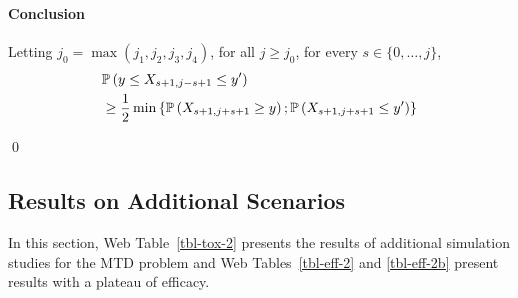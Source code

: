 \paragraph{Conclusion} Letting $j_0 = \max(j_1,j_2,j_3,j_4)$, for all $j\geq j_0$, for every $s \in \{0,\dots,j\}$,
\begin{align*}
&\mathbb{P}\left(y \leq X_{s+1,j-s+1} \leq y'\right)
\\& \geq \frac{1}{2}\min \left\{\mathbb{P}\left(X_{s+1,j+s+1} \geq y\right) ; \mathbb{P}\left(X_{s+1,j+s+1} \leq y'\right)\right\}
\end{align*}

\qed


\subsection{Results on Additional Scenarios}\label{sec:ExtraTox}

In this section, Web Table~\ref{tbl-tox-2} presents the results
of additional simulation studies for the MTD problem
and Web Tables~\ref{tbl-eff-2} and \ref{tbl-eff-2b} present results with a plateau of
efficacy.

